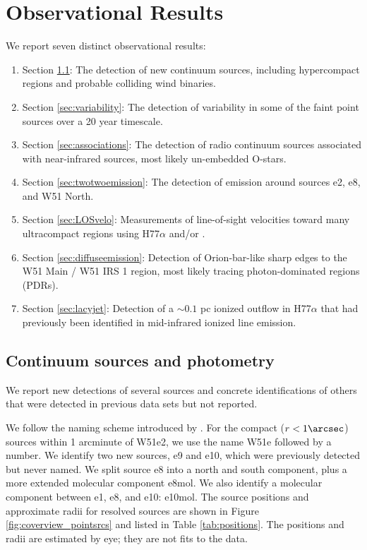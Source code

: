 \section{Observational Results}
\label{sec:results}
We report seven distinct observational results: 
\begin{enumerate}
    \item Section \ref{sec:pointsources}: The detection of new continuum
        sources, including hypercompact \hii regions and probable
        colliding wind binaries. 
    \item Section \ref{sec:variability}: The detection of variability in
        some of the faint point sources over a 20 year timescale.
    \item Section \ref{sec:associations}: The detection of radio continuum
        sources associated with near-infrared sources, most likely un-embedded
        O-stars.
    \item Section \ref{sec:twotwoemission}: The detection of \formaldehyde
        \twotwo emission around sources e2, e8, and W51 North.
    \item Section \ref{sec:LOSvelo}: Measurements of line-of-sight velocities
        toward many ultracompact \hii regions using H77$\alpha$ and/or
        \formaldehyde.
    \item Section \ref{sec:diffuseemission}: Detection of Orion-bar-like sharp
        edges to the W51 Main / W51 IRS 1 \hii region, most likely tracing 
        photon-dominated regions (PDRs).
    \item Section \ref{sec:lacyjet}: Detection of a $\sim0.1$ pc ionized
        outflow in H77$\alpha$ that had previously been identified in
        mid-infrared ionized line emission.
\end{enumerate}

\subsection{Continuum sources and photometry}
\label{sec:pointsources}
We report new detections of several sources and concrete
identifications of others that were detected in previous data sets but not
reported.

We follow the naming scheme introduced by \citet{Mehringer1994a}.  For the
compact ($r<1\arcsec$) sources within 1 arcminute of W51e2, we use the name
W51e followed by a number.  We identify two new sources, e9  and e10, which
were previously detected but never named.  We split source e8 into a north and
south component, plus a more extended molecular component e8mol.  We also
identify a molecular component between e1, e8, and e10: e10mol.  The source
positions and approximate radii for resolved sources are shown in Figure
\ref{fig:coverview_pointsrcs} and listed in Table \ref{tab:positions}.
The positions and radii are estimated by eye; they are not fits to the data.

